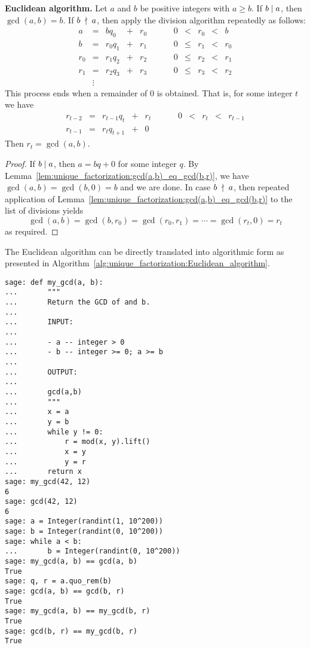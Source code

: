 \begin{theorem}
\label{thm:unique_factorization:Euclidean_algorithm}
\textbf{Euclidean algorithm.}
Let $a$ and $b$ be positive integers with $a \geq b$. If $b \;|\; a$,
then $\gcd(a,b) = b$. If $b \;\nmid\; a$, then apply the division
algorithm repeatedly as follows:
\[
\begin{array}{rclclccccrclcl}
a   &=& bq_0    &+& r_0 &&&& 0 &<&    r_0 &<& b \\
b   &=& r_0 q_1 &+& r_1 &&&& 0 &\leq& r_1 &<& r_0 \\
r_0 &=& r_1 q_2 &+& r_2 &&&& 0 &\leq& r_2 &<& r_1 \\
r_1 &=& r_2 q_3 &+& r_3 &&&& 0 &\leq& r_3 &<& r_2 \\
& \vdots
\end{array}
\]
This process ends when a remainder of $0$ is obtained. That is,
for some integer $t$ we have
\[
\begin{array}{rclclccccrclcl}
r_{t-2} &=& r_{t-1} q_t &+& r_t &&&& 0 &<& r_t &<& r_{t-1} \\
r_{t-1} &=& r_t q_{t+1} &+& 0
\end{array}
\]
Then $r_t = \gcd(a,b)$.
\end{theorem}

\begin{proof}
If $b \;|\; a$, then $a = bq + 0$ for some integer $q$. By
Lemma~\ref{lem:unique_factorization:gcd(a,b)_eq_gcd(b,r)}, we have
$\gcd(a,b) = \gcd(b,0) = b$ and we are done. In case
$b \;\nmid\; a$, then repeated application of
Lemma~\ref{lem:unique_factorization:gcd(a,b)_eq_gcd(b,r)} to the list
of divisions yields
\[
\gcd(a,b)
=
\gcd(b, r_0)
=
\gcd(r_0, r_1)
=
\cdots
=
\gcd(r_t, 0)
=
r_t
\]
as required.
\end{proof}

The Euclidean algorithm can be directly translated into algorithmic
form as presented in
Algorithm~\ref{alg:unique_factorization:Euclidean_algorithm}.

\begin{lstlisting}
sage: def my_gcd(a, b):
...       """
...       Return the GCD of and b.
...
...       INPUT:
...
...       - a -- integer > 0
...       - b -- integer >= 0; a >= b
...
...       OUTPUT:
...
...       gcd(a,b)
...       """
...       x = a
...       y = b
...       while y != 0:
...           r = mod(x, y).lift()
...           x = y
...           y = r
...       return x
sage: my_gcd(42, 12)
6
sage: gcd(42, 12)
6
sage: a = Integer(randint(1, 10^200))
sage: b = Integer(randint(0, 10^200))
sage: while a < b:
...       b = Integer(randint(0, 10^200))
sage: my_gcd(a, b) == gcd(a, b)
True
sage: q, r = a.quo_rem(b)
sage: gcd(a, b) == gcd(b, r)
True
sage: my_gcd(a, b) == my_gcd(b, r)
True
sage: gcd(b, r) == my_gcd(b, r)
True
\end{lstlisting}

